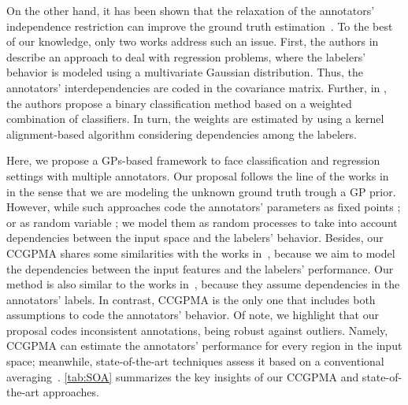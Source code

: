 \documentclass[journal]{IEEEtran}
\begin{document}
On the other hand, it has been shown that the relaxation of the  annotators' independence restriction can improve the ground truth estimation~\cite{zhang2011learning,g2019machine}. To the best of our knowledge, only two works address such an issue. First, the authors in \cite{zhu2019unsupervised} describe an approach to deal with regression problems, where the labelers' behavior is modeled using a multivariate Gaussian distribution. Thus, the annotators' interdependencies are coded in the covariance matrix. Further, in \cite{gil2018learning}, the authors propose a binary classification method based on a weighted combination of classifiers. In turn, the weights are estimated by using a kernel alignment-based algorithm considering dependencies among the labelers. 

Here, we propose a GPs-based framework to face classification and regression settings with multiple annotators. Our proposal follows the line of the works in~\cite{rodrigues2014gaussian,groot2011learning,ruiz2019learning,morales2019scalable,morales2019scalable1} in the sense that we are modeling the unknown ground truth trough a GP prior. However, while such approaches code the annotators' parameters as fixed points \cite{rodrigues2014gaussian,groot2011learning}; or as
random variable \cite{ruiz2019learning,morales2019scalable,morales2019scalable1}; we model them as random processes to take into account dependencies between the input space and the labelers' behavior. Besides, our CCGPMA shares some similarities with the works in~\cite{yan2014learning,xiao2013learning}, because we aim to model the dependencies between the input features and the labelers' performance. Our method is also similar to the works in~\cite{zhu2019unsupervised,gil2018learning}, because they assume dependencies in the annotators' labels. In contrast, CCGPMA is the only one that includes both assumptions to code the annotators' behavior. Of note, we highlight that our proposal codes inconsistent
annotations, being robust against outliers.  Namely, CCGPMA can estimate the annotators'
performance for every region in the input space; meanwhile, state-of-the-art techniques assess it based on a conventional averaging~\cite{rodrigues2017learning,morales2019scalable,ruiz2019learning}. \cref{tab:SOA} summarizes the key insights of our CCGPMA and state-of-the-art approaches.
\end{document}
